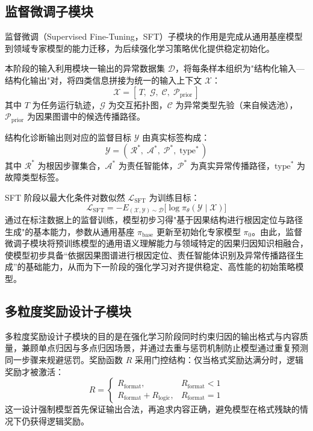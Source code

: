 \subsection{监督微调子模块}
 
监督微调（Supervised Fine-Tuning，SFT）子模块的作用是完成从通用基座模型到领域专家模型的能力迁移，为后续强化学习策略优化提供稳定初始化。
 
本阶段的输入利用模块一输出的异常数据集 $\mathcal{D}$，将每条样本组织为"结构化输入—结构化输出"对，将四类信息拼接为统一的输入上下文 $\mathcal{X}$：
\begin{equation}
  \mathcal{X} = [\,T,\; \mathcal{G},\; \mathcal{C},\; \mathcal{P}_{\text{prior}}\,]
\end{equation}
其中 $T$ 为任务运行轨迹，$\mathcal{G}$ 为交互拓扑图，$\mathcal{C}$ 为异常类型先验（来自候选池），$\mathcal{P}_{\text{prior}}$ 为因果图谱中的候选传播路径。

结构化诊断输出则对应的监督目标 $\mathcal{Y}$ 由真实标签构成：
\begin{equation}
  \mathcal{Y} = (\,\mathcal{R}^*,\; \mathcal{A}^*,\; \mathcal{P}^*,\; \text{type}^*\,)
\end{equation}
其中 $\mathcal{R}^*$ 为根因步骤集合，$\mathcal{A}^*$ 为责任智能体，$\mathcal{P}^*$ 为真实异常传播路径，$\text{type}^*$ 为故障类型标签。
 
SFT 阶段以最大化条件对数似然 $ \mathcal{L}_{\text{SFT}} $ 为训练目标：
\begin{equation}
  \mathcal{L}_{\text{SFT}} = -E_{(\mathcal{X}, \mathcal{Y}) \sim \mathcal{D}}\bigl[\log \pi_\theta(\mathcal{Y} \mid \mathcal{X})\bigr]
\end{equation}
通过在标注数据上的监督训练，模型初步习得"基于因果结构进行根因定位与路径生成"的基本能力，参数从通用基座 $\pi_{\text{base}}$ 更新至初始化专家模型 $\pi_0$。由此，监督微调子模块将预训练模型的通用语义理解能力与领域特定的因果归因知识相融合，使模型初步具备“依据因果图谱进行根因定位、责任智能体识别及异常传播路径生成”的基础能力，从而为下一阶段的强化学习对齐提供稳定、高性能的初始策略模型。

\subsection{多粒度奖励设计子模块}

多粒度奖励设计子模块的目的是在强化学习阶段同时约束归因的输出格式与内容质量，兼顾单点归因与多点归因场景，并通过去重与惩罚机制防止模型通过重复预测同一步骤来规避惩罚。奖励函数 $R$ 采用门控结构：仅当格式奖励达满分时，逻辑奖励才被激活：
\begin{equation}
  R = \begin{cases}
    R_{\text{format}}, & R_{\text{format}} < 1 \\
    R_{\text{format}} + R_{\text{logic}}, & R_{\text{format}} = 1
  \end{cases}
  \label{eq:reward_v3}
\end{equation}
这一设计强制模型首先保证输出合法，再追求内容正确，避免模型在格式残缺的情况下仍获得逻辑奖励。
 

